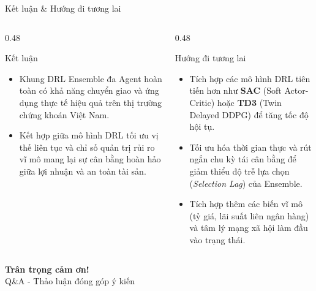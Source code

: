 \documentclass[10pt,aspectratio=169]{beamer}
\begin{document}
\begin{frame}{Kết luận \& Hướng đi tương lai}
  \begin{columns}[t]
    \begin{column}{0.48\textwidth}
      \begin{block}{Kết luận}
        \begin{itemize}
          \item Khung DRL Ensemble đa Agent hoàn toàn có khả năng chuyển giao và ứng dụng thực tế hiệu quả trên thị trường chứng khoán Việt Nam.
          \item Kết hợp giữa mô hình DRL tối ưu vị thế liên tục và chỉ số quản trị rủi ro vĩ mô mang lại sự cân bằng hoàn hảo giữa lợi nhuận và an toàn tài sản.
        \end{itemize}
      \end{block}
    \end{column}
    
    \begin{column}{0.48\textwidth}
      \begin{exampleblock}{Hướng đi tương lai}
        \begin{itemize}
          \item Tích hợp các mô hình DRL tiên tiến hơn như \textbf{SAC} (Soft Actor-Critic) hoặc \textbf{TD3} (Twin Delayed DDPG) để tăng tốc độ hội tụ.
          \item Tối ưu hóa thời gian thực và rút ngắn chu kỳ tái cân bằng để giảm thiểu độ trễ lựa chọn (\textit{Selection Lag}) của Ensemble.
          \item Tích hợp thêm các biến vĩ mô (tỷ giá, lãi suất liên ngân hàng) và tâm lý mạng xã hội làm đầu vào trạng thái.
        \end{itemize}
      \end{exampleblock}
    \end{column}
  \end{columns}
\end{frame}

\begin{frame}[plain,c]
  \color{white}
  \centering
  \Huge \textbf{Trân trọng cảm ơn!}\\
  \vspace{0.5cm}
  \Large Q\&A - Thảo luận đóng góp ý kiến
\end{frame}
\end{document}
